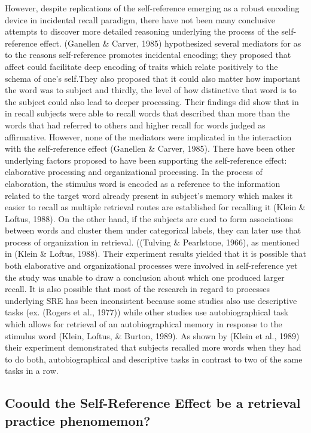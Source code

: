 \documentclass[
  man,floatsintext]{apa6}
\begin{document}
However, despite replications of the self-reference emerging as a robust encoding device in incidental recall paradigm, there have not been many conclusive attempts to discover more detailed reasoning underlying the process of the self-reference effect. (Ganellen \& Carver, 1985) hypothesized several mediators for as to the reasons self-reference promotes incidental encoding; they proposed that affect could facilitate deep encoding of traits which relate positively to the schema of one's self.They also proposed that it could also matter how important the word was to subject and thirdly, the level of how distinctive that word is to the subject could also lead to deeper processing. Their findings did show that in in recall subjects were able to recall words that described than more than the words that had referred to others and higher recall for words judged as affirmative. However, none of the mediators were implicated in the interaction with the self-reference effect (Ganellen \& Carver, 1985). There have been other underlying factors proposed to have been supporting the self-reference effect: elaborative processing and organizational processing. In the process of elaboration, the stimulus word is encoded as a reference to the information related to the target word already present in subject's memory which makes it easier to recall as multiple retrieval routes are established for recalling it (Klein \& Loftus, 1988). On the other hand, if the subjects are cued to form associations between words and cluster them under categorical labels, they can later use that process of organization in retrieval. ((Tulving \& Pearlstone, 1966), as mentioned in (Klein \& Loftus, 1988). Their experiment results yielded that it is possible that both elaborative and organizational processes were involved in self-reference yet the study was unable to draw a conclusion about which one produced larger recall. It is also possible that most of the research in regard to processes underlying SRE has been inconsistent because some studies also use descriptive tasks (ex. (Rogers et al., 1977)) while other studies use autobiographical task which allows for retrieval of an autobiographical memory in response to the stimulus word (Klein, Loftus, \& Burton, 1989). As shown by (Klein et al., 1989) their experiment demonstrated that subjects recalled more words when they had to do both, autobiographical and descriptive tasks in contrast to two of the same tasks in a row.

\hypertarget{coould-the-self-reference-effect-be-a-retrieval-practice-phenomemon}{%
\subsection{Coould the Self-Reference Effect be a retrieval practice phenomemon?}\label{coould-the-self-reference-effect-be-a-retrieval-practice-phenomemon}}
\end{document}
